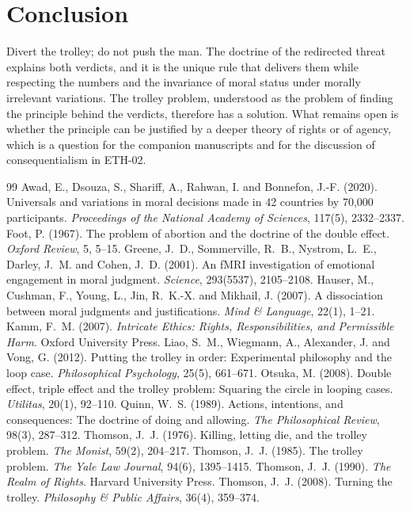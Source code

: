 \documentclass{situationist-preprint}
\begin{document}
\section{Conclusion}

Divert the trolley; do not push the man. The doctrine of the redirected threat explains both verdicts, and it is the unique rule that delivers them while respecting the numbers and the invariance of moral status under morally irrelevant variations. The trolley problem, understood as the problem of finding the principle behind the verdicts, therefore has a solution. What remains open is whether the principle can be justified by a deeper theory of rights or of agency, which is a question for the companion manuscripts and for the discussion of consequentialism in ETH-02.

\begin{thebibliography}{99}\small
{} Awad, E., Dsouza, S., Shariff, A., Rahwan, I. and Bonnefon, J.-F. (2020). Universals and variations in moral decisions made in 42 countries by 70,000 participants. \emph{Proceedings of the National Academy of Sciences}, 117(5), 2332--2337.
 Foot, P. (1967). The problem of abortion and the doctrine of the double effect. \emph{Oxford Review}, 5, 5--15.
 Greene, J.~D., Sommerville, R.~B., Nystrom, L.~E., Darley, J.~M. and Cohen, J.~D. (2001). An fMRI investigation of emotional engagement in moral judgment. \emph{Science}, 293(5537), 2105--2108.
 Hauser, M., Cushman, F., Young, L., Jin, R.~K.-X. and Mikhail, J. (2007). A dissociation between moral judgments and justifications. \emph{Mind \& Language}, 22(1), 1--21.
 Kamm, F.~M. (2007). \emph{Intricate Ethics: Rights, Responsibilities, and Permissible Harm}. Oxford University Press.
 Liao, S.~M., Wiegmann, A., Alexander, J. and Vong, G. (2012). Putting the trolley in order: Experimental philosophy and the loop case. \emph{Philosophical Psychology}, 25(5), 661--671.
 Otsuka, M. (2008). Double effect, triple effect and the trolley problem: Squaring the circle in looping cases. \emph{Utilitas}, 20(1), 92--110.
 Quinn, W.~S. (1989). Actions, intentions, and consequences: The doctrine of doing and allowing. \emph{The Philosophical Review}, 98(3), 287--312.
 Thomson, J.~J. (1976). Killing, letting die, and the trolley problem. \emph{The Monist}, 59(2), 204--217.
 Thomson, J.~J. (1985). The trolley problem. \emph{The Yale Law Journal}, 94(6), 1395--1415.
 Thomson, J.~J. (1990). \emph{The Realm of Rights}. Harvard University Press.
 Thomson, J.~J. (2008). Turning the trolley. \emph{Philosophy \& Public Affairs}, 36(4), 359--374.
\end{thebibliography}
\end{document}
